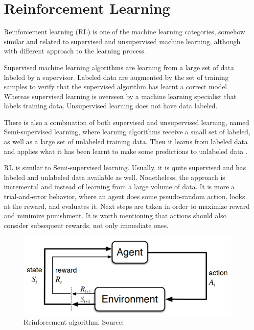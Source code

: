 \documentclass[fleqn,10pt]{olplainarticle}
\begin{document}
\section{Reinforcement Learning}

Reinforcement learning (RL) is one of the machine learning categories, somehow similar and related to supervised and unsupervised machine learning, although with different approach to the learning process.

\vskip10pt

Supervised machine learning algorithms are learning from a large set of data labeled by a supervisor. Labeled data are augmented by the set of training samples to verify that the supervised algorithm has learnt a correct model. Whereas supervised learning is overseen by a machine learning specialist that labels training data. Unsupervised learning does not have data labeled.

\vskip10pt

There is also a combination of both supervised and unsupervised learning, named Semi-supervised learning, where learning algorithms receive a small set of labeled, as well as a large set of unlabeled training data. Then it learns from labeled data and applies what it has been learnt to make some predictions to unlabeled data \cite{Chapelle2010-mm}.

\vskip10pt

RL is similar to Semi-supervised learning. Usually, it is quite supervised and has labeled and unlabeled data available as well. Nonetheless, the approach is incremental and instead of learning from a large volume of data. It is more a trial-and-error behavior, where an agent does some pseudo-random action, looks at the reward, and evaluates it. Next steps are taken in order to maximize reward and minimize punishment. It is worth mentioning that actions should also consider subsequent rewards, not only immediate ones.

\begin{figure}[ht]
    \centering
    \includegraphics[width=0.7\linewidth]{images/reinforcement_learning.png}
    \caption{Reinforcement algorithm. Source: \cite{Sutton1998-ta}}
    \label{fig:figure4}
\end{figure}
\end{document}
